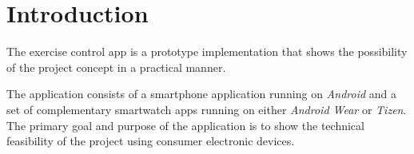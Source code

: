 \section{Introduction}

The exercise control app is a prototype implementation that shows the
possibility of the project concept in a practical manner.

The application consists of a smartphone application running on
\textit{Android} and a set of complementary smartwatch apps running on either
\textit{Android Wear} or \textit{Tizen}. The primary goal and purpose of the
application is to show the technical feasibility of the project using consumer
electronic devices.
